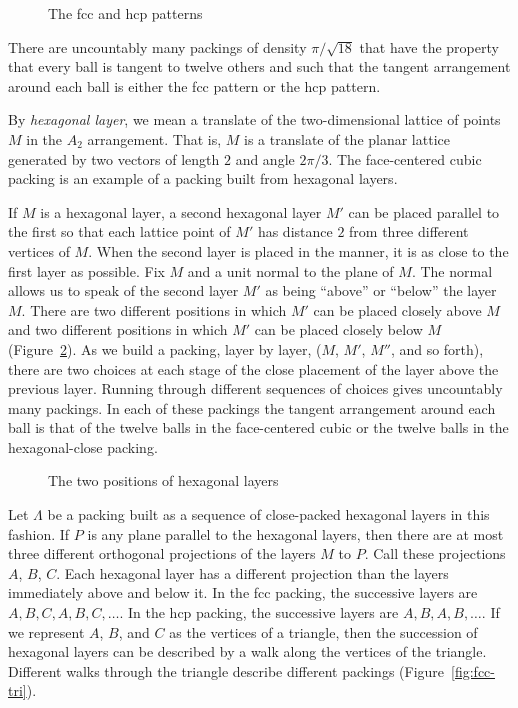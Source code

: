 \begin{figure}[htb]
  \centering
  \caption{The fcc and hcp patterns}
  \label{fig:hcp}
\end{figure}

There are uncountably many packings of density $\pi/\sqrt{18}$
that have the property that every ball is tangent to twelve others
and such that the tangent arrangement around each ball is either
the fcc pattern or the hcp pattern.

By {\it hexagonal layer}, we mean a translate of the two-dimensional
lattice of points $M$ in the $A_2$ arrangement. That is, $M$ is a
translate of the planar lattice generated by two vectors of length
$2$ and angle $2\pi/3$.  The face-centered cubic packing is an
example of a packing built from hexagonal layers.

If $M$ is a hexagonal layer, a second hexagonal layer $M'$ can be
placed parallel to the first so that each lattice point of $M'$ has
distance $2$ from three different vertices of $M$.  When the second
layer is placed in the manner, it is as close to the first layer as
possible. Fix $M$ and a unit normal to the plane of $M$. The normal
allows us to speak of the second layer $M'$ as being ``above'' or
``below'' the layer $M$. There are two different positions in which
$M'$ can be placed closely above $M$ and two different positions in
which $M'$ can be placed closely below $M$  (Figure~\ref{fig:two-holes}). As we build a packing,
layer by layer, ($M$, $M'$, $M''$, and so forth), there are two
choices at each stage of the close placement of the layer above the
previous layer. Running through different sequences of choices gives
uncountably many packings.  In each of these packings the tangent
arrangement around each ball is that of the twelve balls in the
face-centered cubic or the twelve balls in the hexagonal-close
packing.

\begin{figure}[htb]
  \centering
  \caption{The two positions of hexagonal layers}
  \label{fig:two-holes}
\end{figure}

Let $\Lambda$ be a packing built as a sequence of close-packed
hexagonal layers in this fashion.  If $P$ is any plane parallel to
the hexagonal layers, then there are at most three different
orthogonal projections of the layers $M$ to $P$.  Call these
projections $A$, $B$, $C$.  Each hexagonal layer has a different
projection than the layers immediately above and below it.  In the
fcc packing, the successive layers are $A,B,C,A,B,C,\ldots$.  In
the hcp packing, the successive layers are $A,B,A,B,\ldots$.  If
we represent $A$, $B$, and $C$ as the vertices of a triangle, then
the succession of hexagonal layers can be described by a walk
along the vertices of the triangle. Different walks through the
triangle describe different packings (Figure~\ref{fig:fcc-tri}).

